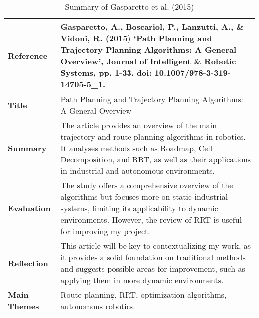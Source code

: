 \documentclass[a4paper,12pt]{report}
\begin{document}
\begin{table}[H]
    \centering
    \begin{tabular}{|p{3cm}|p{10cm}|}
        \hline
        \textbf{Reference} & Gasparetto, A., Boscariol, P., Lanzutti, A., \& Vidoni, R. (2015) ‘Path Planning and Trajectory Planning Algorithms: A General Overview’, Journal of Intelligent \& Robotic Systems, pp. 1-33. doi: 10.1007/978-3-319-14705-5\_1. \\ \hline
        \textbf{Title} & Path Planning and Trajectory Planning Algorithms: A General Overview \\ \hline
        \textbf{Summary} & The article provides an overview of the main trajectory and route planning algorithms in robotics. It analyses methods such as Roadmap, Cell Decomposition, and RRT, as well as their applications in industrial and autonomous environments. \\ \hline
        \textbf{Evaluation} & The study offers a comprehensive overview of the algorithms but focuses more on static industrial systems, limiting its applicability to dynamic environments. However, the review of RRT is useful for improving my project. \\ \hline
        \textbf{Reflection} & This article will be key to contextualizing my work, as it provides a solid foundation on traditional methods and suggests possible areas for improvement, such as applying them in more dynamic environments. \\ \hline
        \textbf{Main Themes} & Route planning, RRT, optimization algorithms, autonomous robotics. \\ \hline
    \end{tabular}
    \caption{Summary of Gasparetto et al. (2015)}
    \label{tab:gasparetto2015}
\end{table}
\end{document}
